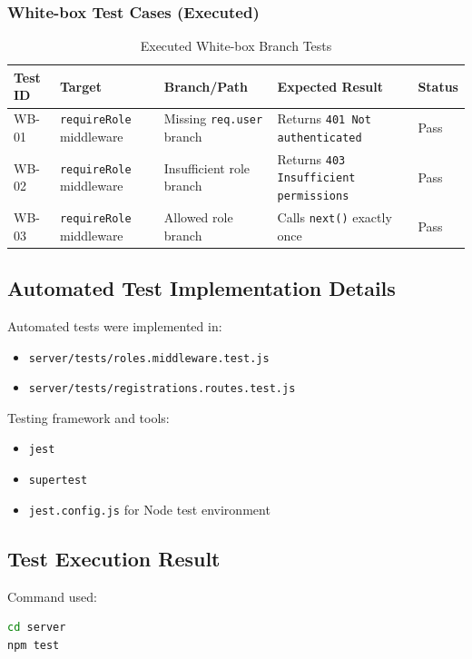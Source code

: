 \documentclass[12pt, a4paper]{article}
\begin{document}
\subsubsection{White-box Test Cases (Executed)}
\begin{table}[H]
\centering
\begin{small}
\begin{tabular}{|p{1.4cm}|p{3.8cm}|p{3.8cm}|p{4.0cm}|p{1.2cm}|}
\hline
\textbf{Test ID} & \textbf{Target} & \textbf{Branch/Path} & \textbf{Expected Result} & \textbf{Status} \\ \hline
WB-01 & \texttt{requireRole} middleware & Missing \texttt{req.user} branch & Returns \texttt{401 Not authenticated} & Pass \\ \hline
WB-02 & \texttt{requireRole} middleware & Insufficient role branch & Returns \texttt{403 Insufficient permissions} & Pass \\ \hline
WB-03 & \texttt{requireRole} middleware & Allowed role branch & Calls \texttt{next()} exactly once & Pass \\ \hline
\end{tabular}
\end{small}
\caption{Executed White-box Branch Tests}
\end{table}

\subsection{Automated Test Implementation Details}
Automated tests were implemented in:
\begin{itemize}
    \item \texttt{server/tests/roles.middleware.test.js}
    \item \texttt{server/tests/registrations.routes.test.js}
\end{itemize}

Testing framework and tools:
\begin{itemize}
    \item \texttt{jest}
    \item \texttt{supertest}
    \item \texttt{jest.config.js} for Node test environment
\end{itemize}

\subsection{Test Execution Result}
Command used:
\begin{lstlisting}[language=bash]
cd server
npm test
\end{lstlisting}
\end{document}
